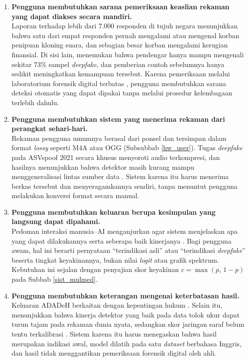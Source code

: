 \begin{enumerate}[{KP-}01.]
  \item \textbf{Pengguna membutuhkan sarana pemeriksaan keaslian rekaman yang dapat diakses secara mandiri.}\\
  Laporan \textcite{mcafee2023impostor} terhadap lebih dari 7.000 responden di tujuh negara menunjukkan bahwa satu dari empat responden pernah mengalami atau mengenal korban penipuan kloning suara, dan sebagian besar korban mengalami kerugian finansial. Di sisi lain, \textcite{mai2023warning} menemukan bahwa pendengar hanya mampu mengenali sekitar 73\% sampel \textit{deepfake}, dan pemberian contoh sebelumnya hanya sedikit meningkatkan kemampuan tersebut. Karena pemeriksaan melalui laboratorium forensik digital terbatas \autocite{SIP_Law_Firm_2025}, pengguna membutuhkan sarana deteksi otomatis yang dapat dipakai tanpa melalui prosedur kelembagaan terlebih dahulu.

  \item \textbf{Pengguna membutuhkan sistem yang menerima rekaman dari perangkat sehari-hari.}\\
  Rekaman pengguna umumnya berasal dari ponsel dan tersimpan dalam format \textit{lossy} seperti M4A atau OGG (Subsubbab \ref{hw_user}). Tugas \textit{deepfake} pada ASVspoof 2021 secara khusus menyoroti audio terkompresi, dan hasilnya menunjukkan bahwa detektor masih kurang mampu menggeneralisasi lintas sumber data \autocite{liu2023asvspoof2021}. Sistem karena itu harus menerima berkas tersebut dan menyeragamkannya sendiri, tanpa menuntut pengguna melakukan konversi format secara manual.

  \item \textbf{Pengguna membutuhkan keluaran berupa kesimpulan yang langsung dapat dipahami.}\\
  Pedoman interaksi manusia--AI menganjurkan agar sistem menjelaskan apa yang dapat dilakukannya serta seberapa baik kinerjanya \autocite{amershi2019guidelines}. Bagi pengguna awam, hal ini berarti pernyataan ``terindikasi asli'' atau ``terindikasi \textit{deepfake}'' beserta tingkat keyakinannya, bukan nilai \textit{logit} atau grafik spektrum. Kebutuhan ini sejalan dengan penyajian skor keyakinan $c = \max(p,\, 1-p)$ pada Subbab \ref{sist_mulmed}.

  \item \textbf{Pengguna membutuhkan keterangan mengenai keterbatasan hasil.}\\
  Keluaran ADADeH berkaitan dengan kepentingan hukum \autocite{Iman_2026}. Selain itu, \textcite{muller2022generalize} menunjukkan bahwa kinerja detektor yang baik pada data tolok ukur dapat turun tajam pada rekaman dunia nyata, sedangkan skor jaringan saraf belum tentu terkalibrasi \autocite{guo2017calibration}. Sistem karena itu harus menegaskan bahwa hasil merupakan indikasi awal, model dilatih pada satu \textit{dataset} berbahasa Inggris, dan hasil tidak menggantikan pemeriksaan forensik digital oleh ahli.


\end{enumerate}
